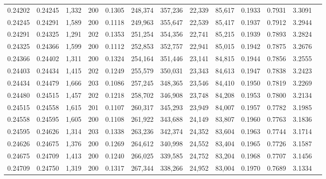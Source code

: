 \begin{tabular}{rrrrrrrrrrrrr}
0.24202 & 0.24245 & 1,332 & 200 &                                     0.1305 & 248,374 & 357,236 &  22,339 &  85,617 & 0.1933 & 0.7931 & 3.3091 \\
0.24245 & 0.24291 & 1,589 & 200 &                                     0.1118 & 249,963 & 355,647 &  22,539 &  85,417 & 0.1937 & 0.7912 & 3.2944 \\
0.24291 & 0.24325 & 1,291 & 202 &                                     0.1353 & 251,254 & 354,356 &  22,741 &  85,215 & 0.1939 & 0.7893 & 3.2824 \\
0.24325 & 0.24366 & 1,599 & 200 &                                     0.1112 & 252,853 & 352,757 &  22,941 &  85,015 & 0.1942 & 0.7875 & 3.2676 \\
0.24366 & 0.24402 & 1,311 & 200 &                                     0.1324 & 254,164 & 351,446 &  23,141 &  84,815 & 0.1944 & 0.7856 & 3.2555 \\
0.24403 & 0.24434 & 1,415 & 202 &                                     0.1249 & 255,579 & 350,031 &  23,343 &  84,613 & 0.1947 & 0.7838 & 3.2423 \\
0.24434 & 0.24479 & 1,666 & 203 &                                     0.1086 & 257,245 & 348,365 &  23,546 &  84,410 & 0.1950 & 0.7819 & 3.2269 \\
0.24480 & 0.24515 & 1,457 & 202 &                                     0.1218 & 258,702 & 346,908 &  23,748 &  84,208 & 0.1953 & 0.7800 & 3.2134 \\
0.24515 & 0.24558 & 1,615 & 201 &                                     0.1107 & 260,317 & 345,293 &  23,949 &  84,007 & 0.1957 & 0.7782 & 3.1985 \\
0.24558 & 0.24595 & 1,605 & 200 &                                     0.1108 & 261,922 & 343,688 &  24,149 &  83,807 & 0.1960 & 0.7763 & 3.1836 \\
0.24595 & 0.24626 & 1,314 & 203 &                                     0.1338 & 263,236 & 342,374 &  24,352 &  83,604 & 0.1963 & 0.7744 & 3.1714 \\
0.24626 & 0.24675 & 1,376 & 200 &                                     0.1269 & 264,612 & 340,998 &  24,552 &  83,404 & 0.1965 & 0.7726 & 3.1587 \\
0.24675 & 0.24709 & 1,413 & 200 &                                     0.1240 & 266,025 & 339,585 &  24,752 &  83,204 & 0.1968 & 0.7707 & 3.1456 \\
0.24709 & 0.24750 & 1,319 & 200 &                                     0.1317 & 267,344 & 338,266 &  24,952 &  83,004 & 0.1970 & 0.7689 & 3.1334 \\

\end{tabular}
